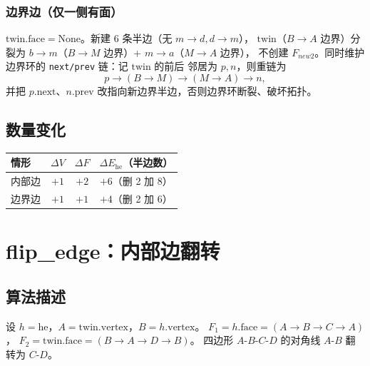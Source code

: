 \documentclass[11pt,a4paper]{article}
\begin{document}
\subsubsection{边界边（仅一侧有面）}

$\mathrm{twin}.\mathrm{face} = \mathrm{None}$。新建 6 条半边（无 $m \to d, d \to m$），
$\mathrm{twin}$（$B \to A$ 边界）分裂为 $b \to m$（$B \to M$ 边界）+ $m \to a$（$M \to A$ 边界），
不创建 $F_{new2}$。同时维护边界环的 \texttt{next/prev} 链：记 $\mathrm{twin}$ 的前后
邻居为 $p, n$，则重链为
\[
  p \to (B \to M) \to (M \to A) \to n,
\]
并把 $p.\mathrm{next}$、$n.\mathrm{prev}$ 改指向新边界半边，否则边界环断裂、破坏拓扑。

\subsection{数量变化}

\begin{center}
\renewcommand{\arraystretch}{1.18}
\begin{tabular}{@{}lccc@{}}
  \toprule
  \textbf{情形} & $\Delta V$ & $\Delta F$ & $\Delta E_{\mathrm{he}}$（半边数） \\
  \midrule
  内部边 & $+1$ & $+2$ & $+6$（删 2 加 8） \\
  边界边 & $+1$ & $+1$ & $+4$（删 2 加 6） \\
  \bottomrule
\end{tabular}
\end{center}

\section{flip\_edge：内部边翻转}

\subsection{算法描述}

设 $h = \mathrm{he}$，$A = \mathrm{twin}.\mathrm{vertex}$，$B = h.\mathrm{vertex}$。
$F_1 = h.\mathrm{face} = (A \to B \to C \to A)$，
$F_2 = \mathrm{twin}.\mathrm{face} = (B \to A \to D \to B)$。
四边形 $A$-$B$-$C$-$D$ 的对角线 $A$-$B$ 翻转为 $C$-$D$。
\end{document}
